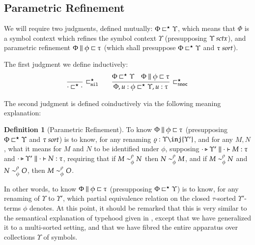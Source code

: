 \documentclass[11pt]{article}
\theoremstyle{definition}
\newtheorem{definition}[thm]{Definition}
\theoremstyle{remark}
\numberwithin{equation}{section}
\def\IModeColorName{MidnightBlue}
\def\OModeColorName{Maroon}
\def\IModeColorName{Black}
\def\OModeColorName{Black}
\newcommand\IMode[1]{{\color{\IModeColorName}{#1}}}
\newcommand\OMode[1]{{\color{\OModeColorName}{#1}}}
\newcommand\Of[2]{\IMode{#1}: \IMode{#2}}
\newcommand\IsSort[1]{\IMode{#1}\ \textit{sort}}
\newcommand\IsSymCtx[1]{\IMode{#1}\ \textit{sctx}}
\newcommand\IsAbtUnmoded[5]{
  #1\triangleright%
  #2\parallel%
  #3\vdash%
  #4:\OMode{#5}%
}
\newcommand\IsAbt[5]{\IsAbtUnmoded{\IMode{#1}}{\IMode{#2}}{\IMode{#3}}{\IMode{#4}}{\OMode{#5}}}
\newcommand\Refines[3]{\IMode{#1}\parallel\IMode{#2}\sqsubset\OMode{#3}}
\newcommand\RefinesCtx[2]{\IMode{#1}\sqsubset^\star\OMode{#2}}
\begin{document}
\subsection{Parametric Refinement}

We will require two judgments, defined mutually: $\RefinesCtx{\Phi}{\Upsilon}$,
which means that $\Phi$ is a symbol context which refines the symbol context
$\Upsilon$ (presupposing $\IsSymCtx{\Upsilon}$), and parametric refinement
$\Refines{\Phi}{\phi}{\tau}$ (which shall presuppose
$\RefinesCtx{\Phi}{\Upsilon}$ and $\IsSort{\tau}$).

\newcommand\RefinesCtxNil{\sqsubset^\star_{\mathtt{nil}}}
\newcommand\RefinesCtxSnoc{\sqsubset^\star_{\mathtt{snoc}}}

The first judgment we define inductively:
\begin{gather*}
  \infer[\RefinesCtxNil]{
    \RefinesCtx{\cdot}{\cdot}
  }{
  }\qquad
  \infer[\RefinesCtxSnoc]{
    \RefinesCtx{\Phi,u:\phi}{\Upsilon,u:\tau}
  }{
    \RefinesCtx{\Phi}{\Upsilon} &
    \Refines{\Phi}{\phi}{\tau}
  }
\end{gather*}

The second judgment is defined coinductively via the following meaning
explanation:
\begin{definition}[Parametric Refinement]
  To know $\Refines{\Phi}{\phi}{\tau}$ (presupposing
  $\RefinesCtx{\Phi}{\Upsilon}$ and $\IsSort{\tau}$) is to know, for any renaming
  $\Of{\varrho}{\Upsilon\inj\OMode{\Upsilon'}}$, and for any $M, N$,
  what it means for $M$ and $N$ to be identified under $\phi$, supposing
  $\IsAbt{\cdot}{\Upsilon'}{\cdot}{M}{\tau}$ and
  $\IsAbt{\cdot}{\Upsilon'}{\cdot}{N}{\tau}$, requiring that if
  $\IMode{M}\sim^\rho_\phi\IMode{N}$ then $\IMode{N}\sim^\rho_\phi\IMode{M}$, and if
  $\IMode{M}\sim^\rho_\phi\IMode{N}$ and $\IMode{N}\sim^\rho_\phi\IMode{O}$, then
  $\IMode{M}\sim^\rho_\phi\IMode{O}$.
\end{definition}

In other words, to know $\Refines{\Phi}{\phi}{\tau}$ (presupposing
$\RefinesCtx{\Phi}{\Upsilon}$) is to know, for any renaming of $\Upsilon$ to
$\Upsilon'$, which partial equivalence relation on the closed $\tau$-sorted
$\Upsilon'$-terms $\phi$ denotes. At this point, it should be remarked that
this is very similar to the semantical explanation of typehood given in
\cite{martin-lof:1979}, except that we have generalized it to a multi-sorted
setting, and that we have fibred the entire apparatus over collections
$\Upsilon$ of symbols.
\end{document}
